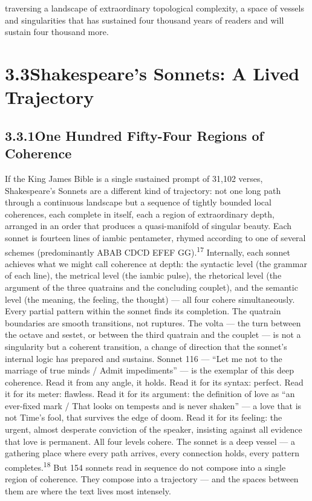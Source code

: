 traversing a landscape of extraordinary topological complexity, a space of vessels and singularities that has sustained four thousand years of readers and will sustain four thousand more.

\section{3.3\quad Shakespeare’s Sonnets: A Lived Trajectory}

\subsection{3.3.1\quad One Hundred Fifty-Four Regions of Coherence}

If the King James Bible is a single sustained prompt of 31,102 verses, Shakespeare’s Sonnets are a different kind of trajectory: not one long path through a continuous landscape but a sequence of tightly bounded local coherences, each complete in itself, each a region of extraordinary depth, arranged in an order that produces a quasi-manifold of singular beauty. Each sonnet is fourteen lines of iambic pentameter, rhymed according to one of several schemes (predominantly ABAB CDCD EFEF GG).\textsuperscript{17} Internally, each sonnet achieves what we might call coherence at depth: the syntactic level (the grammar of each line), the metrical level (the iambic pulse), the rhetorical level (the argument of the three quatrains and the concluding couplet), and the semantic level (the meaning, the feeling, the thought) — all four cohere simultaneously. Every partial pattern within the sonnet finds its completion. The quatrain boundaries are smooth transitions, not ruptures. The volta — the turn between the octave and sestet, or between the third quatrain and the couplet — is not a singularity but a coherent transition, a change of direction that the sonnet’s internal logic has prepared and sustains. Sonnet 116 — “Let me not to the marriage of true minds / Admit impediments” — is the exemplar of this deep coherence. Read it from any angle, it holds. Read it for its syntax: perfect. Read it for its meter: flawless. Read it for its argument: the definition of love as “an ever-fixed mark / That looks on tempests and is never shaken” — a love that is not Time’s fool, that survives the edge of doom. Read it for its feeling: the urgent, almost desperate conviction of the speaker, insisting against all evidence that love is permanent. All four levels cohere. The sonnet is a deep vessel — a gathering place where every path arrives, every connection holds, every pattern completes.\textsuperscript{18} But 154 sonnets read in sequence do not compose into a single region of coherence. They compose into a trajectory — and the spaces between them are where the text lives most intensely.

